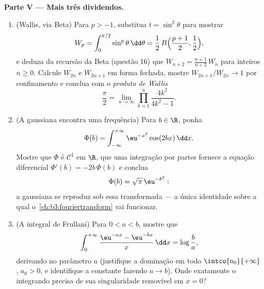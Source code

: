 \begin{problem}
\medskip
\noindent\textbf{Parte V --- Mais três dividendos.}
\begin{enumerate}[resume]
  \item (Wallis, via Beta) Para $p > -1$, substitua $t =
        \sin^2\theta$ para
        mostrar
        \[
        W_p = \int_0^{\pi/2}\sin^p\theta\,\dd\theta
        = \frac12\,B\Bigl(\frac{p+1}2, \frac12\Bigr),
        \]
        e deduza da recursão da Beta (questão 16) que $W_{n+2} = \frac{n+1}{n+2}\,W_n$ para
        inteiros $n \geq
        0$. Calcule $W_{2n}$ e $W_{2n+1}$ em forma fechada,
        mostre $W_{2n+1}/W_{2n} \to 1$ por confinamento e conclua com o \emph{produto de
        Wallis}
        \[
        \frac\pi2 = \lim_{n\to\infty}
        \prod_{k=1}^{n}\frac{4k^2}{4k^2 - 1} .
        \]
  \item (A gaussiana encontra uma frequência) Para $b \in \R$, ponha
        \[
        \Phi(b) = \int_{-\infty}^{+\infty}
        \eu^{-x^2}\cos(2bx)\,\dd x .
        \]
        Mostre que $\Phi$ é $\mathcal C^1$ em $\R$, que uma integração por
        partes fornece a equação diferencial $\Phi'(b) = -2b\,\Phi(b)$ e conclua
        \[
        \Phi(b) = \sqrt\pi\,\eu^{-b^2} :
        \]
        a gaussiana se reproduz sob essa transformada --- a única
        identidade sobre a qual o~\cref{ch:b3:fouriertransform} vai funcionar.
  \item (A integral de Frullani) Para $0 < a < b$, mostre que
        \[
        \int_0^{+\infty}
        \frac{\eu^{-ax} - \eu^{-bx}}{x}\,\dd x
        = \log\frac ba ,
        \]
        derivando no parâmetro $a$ (justifique a dominação em todo
        $\intco{a_0}{+\infty}$, $a_0 > 0$, e identifique a constante fazendo $a \to b$). Onde
        exatamente o integrando precisa de sua singularidade removível
        em $x = 0$?
\end{enumerate}
\end{problem}
